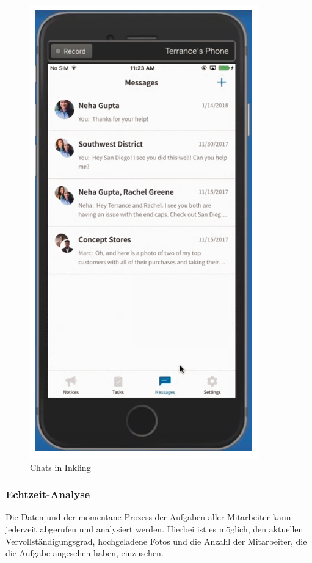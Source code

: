 \begin{figure}[H] 
\centering 
\includegraphics[scale=0.72]{images/inkmsg} 
\caption[Chats in Inkling]{Chats in Inkling\protect} 
\label{ws} 
\end{figure}


\subsubsection{Echtzeit-Analyse}

Die Daten und der momentane Prozess der Aufgaben aller Mitarbeiter kann jederzeit abgerufen und analysiert werden. Hierbei ist es möglich, den aktuellen Vervollständigungsgrad, hochgeladene Fotos und die Anzahl der Mitarbeiter, die die Aufgabe angesehen haben, einzusehen. 

